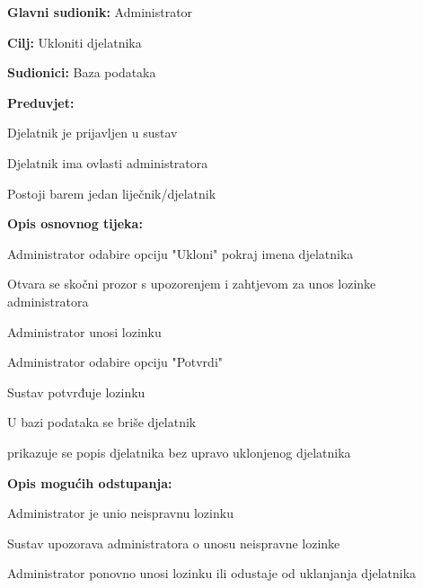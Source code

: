 				\noindent {}
				\begin{packed_item}
					
					\item \textbf{Glavni sudionik: }Administrator
					\item  \textbf{Cilj: }Ukloniti djelatnika
					\item  \textbf{Sudionici: }Baza podataka
					\item  \textbf{Preduvjet: }
					\item[] \begin{packed_enum}
						
						\item[-] Djelatnik je prijavljen u sustav
						\item[-] Djelatnik ima ovlasti administratora
						\item[-] Postoji barem jedan liječnik/djelatnik
					\end{packed_enum}
					\item  \textbf{Opis osnovnog tijeka: }
					
					\item[] \begin{packed_enum}
						\item Administrator odabire opciju "Ukloni" pokraj imena djelatnika
						\item Otvara se skočni prozor s upozorenjem i zahtjevom za unos lozinke administratora
						\item Administrator unosi lozinku
						\item Administrator odabire opciju "Potvrdi"
						\item Sustav potvrđuje lozinku
						\item U bazi podataka se briše djelatnik
						\item prikazuje se popis djelatnika bez upravo uklonjenog djelatnika
					\end{packed_enum}
					
					\item  \textbf{Opis mogućih odstupanja:}
					
					\item[] \begin{packed_item}
						
						\item[5.a] Administrator je unio neispravnu lozinku
						\item[] \begin{packed_enum}
							\item Sustav upozorava administratora o unosu neispravne lozinke 
							\item Administrator ponovno unosi lozinku ili odustaje od uklanjanja djelatnika					
						\end{packed_enum}
					\end{packed_item}
				\end{packed_item}
					
